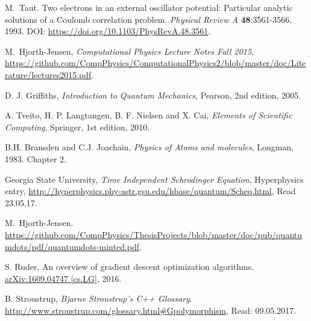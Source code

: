 \documentclass[../main.tex]{subfiles}
\begin{document}
\begin{thebibliography}{99}
 M.~Taut. Two electrons in an external oscillator potential: Particular analytic solutions
of a Coulomb correlation problem. \emph{Physical Review A} {\bf 48}:3561-3566, 1993. DOI: \url{https://doi.org/10.1103/PhysRevA.48.3561}.


 M.~Hjorth-Jensen, \emph{Computational Physics Lecture Notes Fall 2015},  \url{https://github.com/CompPhysics/ComputationalPhysics2/blob/master/doc/Literature/lectures2015.pdf}.%

 D. J. Griffiths, \emph{Introduction to Quantum Mechanics}, Pearson,
2nd edition, 2005.

 A. Tveito, H. P. Langtangen, B. F. Nielsen and X. Cai, \emph{Elements of Scientific Computing}, Springer, 1st edition, 2010.

 B.H. Bransden and C.J. Joachain, \emph{Physics of Atoms and molecules}, Longman, 1983. Chapter
2.

 Georgia State University, \emph{Time Independent Schrodinger Equation}, Hyperphysics entry, \url{http://hyperphysics.phy-astr.gsu.edu/hbase/quantum/Scheq.html}, Read 23.05.17.


 M.~Hjorth-Jensen. \url{https://github.com/CompPhysics/ThesisProjects/blob/master/doc/pub/quantumdots/pdf/quantumdots-minted.pdf}.


 S. Ruder, An overview of gradient descent optimization
algorithms. \href{https://arxiv.org/abs/1609.04747}{arXiv:1609.04747 [cs.LG]}, 2016.


 B. Stroustrup, \emph{Bjarne Stroustrup's C++ Glossary}.  \url{http://www.stroustrup.com/glossary.html#Gpolymorphism}, Read: 09.05.2017.


\end{thebibliography}
\end{document}
